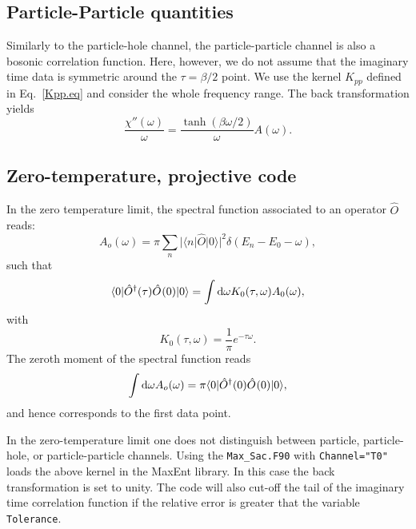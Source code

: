 \subsection{Particle-Particle quantities}

Similarly to the particle-hole channel, the particle-particle channel is also a bosonic correlation function. Here, however, we do not assume that the  imaginary time data is symmetric around   the $\tau = \beta/2$ point.  We use the kernel $K_{pp}$ defined in Eq.~\eqref{Kpp.eq}  and consider the whole frequency range. 
The back transformation  yields
\begin{equation}
 \frac{\chi''(\omega)} {\omega}   = \frac{\tanh \left( \beta \omega/2 \right) }{ \omega }   A(\omega) .
\end{equation}




\subsection{Zero-temperature, projective code}

 In the zero temperature limit,  the spectral function associated to an operator $\hat{O} $    reads:
 \begin{equation}
 	  A_o(\omega)    = \pi  \sum_{n}    | \langle n  | \hat{O} | 0 \rangle |^2 \delta( E_n - E_0 - \omega) ,
 \end{equation}
 such that 
 \begin{equation}
 	\langle 0 | \hat{O}^{\dagger}(\tau) \hat{O}^{}(0) | 0 \rangle =  \int \mathrm{d}\omega  K_0(\tau,\omega) A_0(\omega) ,
 \end{equation}
 with 
 \begin{equation}
 	K_0(\tau,\omega)  = \frac{1}{\pi}e^{-\tau \omega}.
 \end{equation}
 The zeroth moment of the spectral function reads
 \begin{equation}
  \int \mathrm{d} \omega A_o(\omega) = \pi \langle 0 | \hat{O}^{\dagger}(0) \hat{O}^{}(0) | 0 \rangle, 
 \end{equation}
 and hence corresponds to the first data point.
 
 In the zero-temperature limit one does not distinguish between  particle, particle-hole, or particle-particle channels.
 Using the \texttt{Max\_Sac.F90}  with \texttt{Channel="T0"} loads the above kernel in the MaxEnt library. In this case the back  transformation is set to unity. 
 The code will also cut-off the tail of the  imaginary time correlation function  if the relative error is greater that the variable \texttt{Tolerance}. 
 
